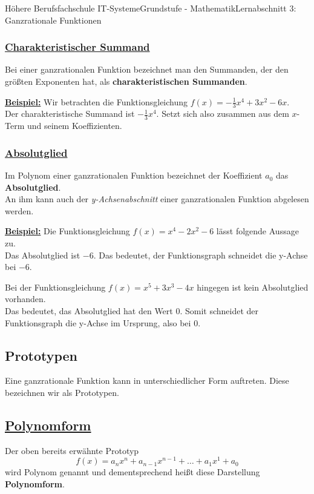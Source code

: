 \documentclass[11pt,twocolumn,oneside,openany,headings=optiontotoc,11pt,numbers=noenddot]{article}
\begin{document}
\begin{worksheet}{Höhere Berufsfachschule IT-Systeme}{Grundstufe - Mathematik}{Lernabschnitt 3: Ganzrationale Funktionen}
		\subsubsection*{\underline{Charakteristischer Summand}}
		Bei einer ganzrationalen Funktion bezeichnet man den Summanden, der den größten Exponenten hat, als \textbf{charakteristischen Summanden}.\\
		\par\noindent
		\underline{\textbf{Beispiel:}} Wir betrachten die Funktionsgleichung \(f(x) = -\frac{1}{3}x^4 + 3x^2 - 6x\).\\
		Der charakteristische Summand ist \colorbox{green!10}{\(-\frac{1}{3}x^4\)}. Setzt sich also zusammen aus dem \(x\)-Term und seinem Koeffizienten.
		\subsubsection*{\underline{Absolutglied}}
		Im Polynom einer ganzrationalen Funktion bezeichnet der Koeffizient \(a_0\) das \textbf{Absolutglied}.\\
		An ihm kann auch der \textit{y-Achsenabschnitt} einer ganzrationalen Funktion abgelesen werden.\\
		\par\noindent
		\underline{\textbf{Beispiel:}} Die Funktionsgleichung \(f(x) = x^4 - 2x^2 - 6\) lässt folgende Aussage zu.\\
		Das Absolutglied ist \colorbox{green!10}{\(-6\)}. Das bedeutet, der Funktionsgraph schneidet die y-Achse bei \(-6\).\\
		\par\noindent
		Bei der Funktionsgleichung \(f(x) = x^5 +3x^3 - 4x\) hingegen ist kein Absolutglied vorhanden.\\
		Das bedeutet, das Absolutglied hat den Wert \colorbox{green!10}{\(0\)}. Somit schneidet der Funktionsgraph die y-Achse im Ursprung, also bei \(0\).
		\subsection{Prototypen}
		Eine ganzrationale Funktion kann in unterschiedlicher Form auftreten. Diese bezeichnen wir als Prototypen.
		\subsection*{\underline{Polynomform}}
		Der oben bereits erwähnte Prototyp \[f(x) = a_nx^n + a_{n-1}x^{n-1} + \ldots + a_1x^1 + a_0\] wird Polynom genannt und dementsprechend heißt diese Darstellung \textbf{Polynomform}.

\end{worksheet}
\end{document}
